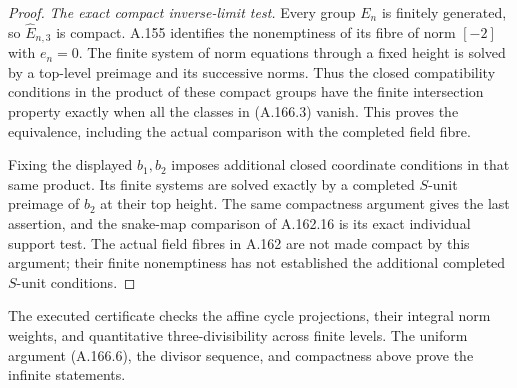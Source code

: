\begin{proof}
\emph{The exact compact inverse-limit test.}
Every group \(E_n\) is finitely generated, so
\(\widehat E_{n,3}\) is compact.  A.155 identifies the
nonemptiness of its fibre of norm \([-2]\) with \(e_n=0\).
The finite system of norm equations through a fixed height is
solved by a top-level preimage and its successive norms.  Thus the
closed compatibility conditions in the product of these compact
groups have the finite intersection property exactly when all
the classes in (A.166.3) vanish.  This proves the equivalence,
including the actual comparison with the completed field fibre.

Fixing the displayed \(b_1,b_2\) imposes additional closed
coordinate conditions in that same product.  Its finite systems
are solved exactly by a completed \(S\)-unit preimage of \(b_2\)
at their top height.  The same compactness argument gives the last
assertion, and the snake-map comparison of A.162.16 is its exact
individual support test.  The actual field fibres in A.162 are
not made compact by this argument; their finite nonemptiness has
not established the additional completed \(S\)-unit conditions.
\end{proof}

The executed certificate
checks the affine cycle projections, their integral norm weights,
and quantitative three-divisibility across finite levels.  The
uniform argument (A.166.6), the divisor sequence, and compactness
above prove the infinite statements.
